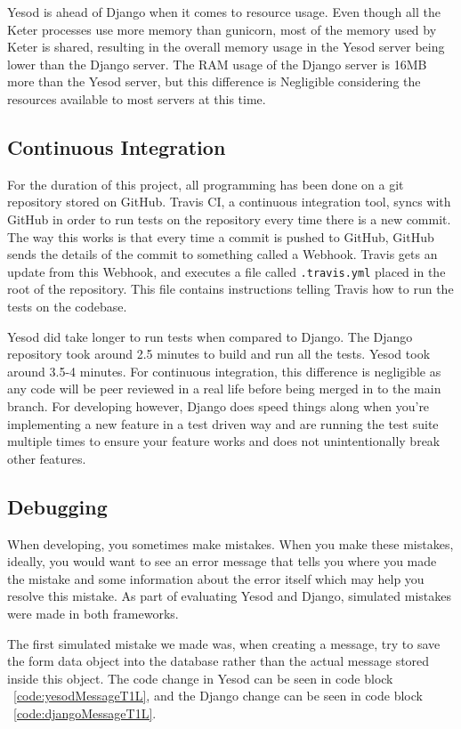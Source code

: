 Yesod is ahead of Django when it comes to resource usage. Even though all the
Keter processes use more memory than gunicorn, most of the memory used by Keter
is shared, resulting in the overall memory usage in the Yesod server being lower
than the Django server. The RAM usage of the Django server is 16MB more than
the Yesod server, but this difference is Negligible considering the resources
available to most servers at this time.

\subsection{Continuous Integration}

For the duration of this project, all programming has been done on a git
repository stored on GitHub. Travis CI, a continuous integration tool,
syncs with GitHub in order to run tests on the repository every time
there is a new commit. The way this works is that every time a commit
is pushed to GitHub, GitHub sends the details of the commit to something
called a Webhook. Travis gets an update from this Webhook, and executes
a file called \texttt{.travis.yml} placed in the root of the repository.
This file contains instructions telling Travis how to run the tests
on the codebase.

Yesod did take longer to run tests when compared to Django. The Django
repository took around 2.5 minutes to build and run all the tests. Yesod
took around 3.5-4 minutes. For continuous integration, this difference
is negligible as any code will be peer reviewed in a real life before being
merged in to the main branch. For developing however, Django does speed
things along when you're implementing a new feature in a test driven way
and are running the test suite multiple times to ensure your feature
works and does not unintentionally break other features.

\subsection{Debugging}

When developing, you sometimes make mistakes. When you make these mistakes,
ideally, you would want to see an error message that tells you where you
made the mistake and some information about the error itself which may
help you resolve this mistake. As part of evaluating Yesod and Django,
simulated mistakes were made in both frameworks.

The first simulated mistake we made was, when creating a message, try
to save the form data object into the database rather than the actual
message stored inside this object. The code change in Yesod can be
seen in code block ~\ref{code:yesodMessageT1L}, and the Django change can
be seen in code block ~\ref{code:djangoMessageT1L}.


